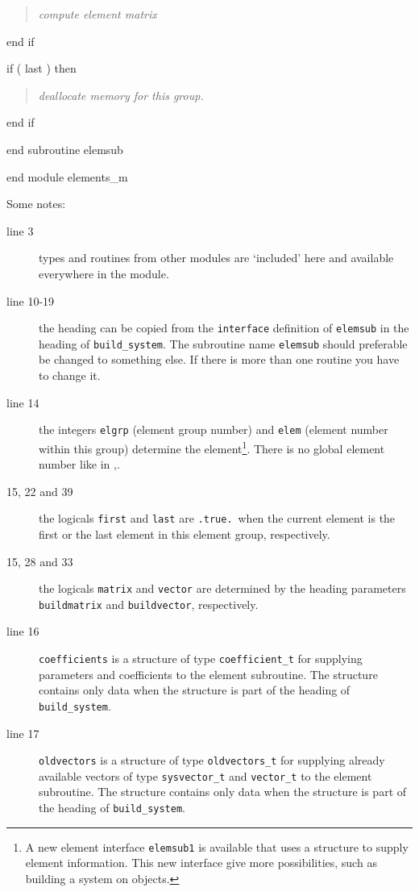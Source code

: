 \begin{quote}
   \qquad\emph{compute element matrix}
\end{quote}
\begin{listingcont}

    end if
   
\end{listingcont}
\begin{listingcont}

    if ( last ) then
   
\end{listingcont}
\begin{quote}
   \qquad\emph{deallocate memory for this group.}
\end{quote}
\begin{listingcont}

    end if
   
  end subroutine elemsub

end module elements_m
\end{listingcont}
\bigskip
Some notes:
\begin{description}
   \item[line 3] types and routines from other modules are `included'
   here and available everywhere in the module.
  \item[line 10-19] the heading can be copied from the \texttt{interface}
    definition of \texttt{elemsub} in the heading of \texttt{build\_system}.
    The subroutine name \texttt{elemsub} should preferable
    be changed to something else. If there is more than one routine you have
    to change it.
  \item[line 14] the integers \texttt{elgrp} (element group number)
   and \texttt{elem} (element number within this group) determine the 
   element\footnote{A new element interface \texttt{elemsub1} is 
   available that uses a structure to supply element information. This new
interface give more possibilities, such as building a system on objects.}.
  There is no global element number like in \sep.
  \item[15, 22 and 39] the logicals \texttt{first} and \texttt{last} are
   \texttt{.true.}\ when the current element is the first or the last element in
      this element group, respectively.
  \item[15, 28 and 33] the logicals \texttt{matrix} and \texttt{vector} are
    determined by the heading parameters \texttt{buildmatrix} and
    \texttt{buildvector}, respectively.
   \item[line 16] \texttt{coefficients} is a structure of type
    \texttt{coefficient\_t} for supplying parameters and coefficients to the
     element subroutine. The structure contains only data when the structure is 
     part of the heading of \texttt{build\_system}.
   \item[line 17] \texttt{oldvectors} is a structure of type
    \texttt{oldvectors\_t} for supplying already available vectors of type
     \texttt{sysvector\_t} and \texttt{vector\_t} to the
     element subroutine. The structure contains only data when the structure is 
     part of the heading of \texttt{build\_system}.
\end{description}

